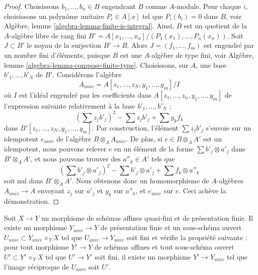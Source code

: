 \begin{proof}
Choisissons $b_1, \ldots, b_n \in B$ engendrant $B$ comme $A$-module.
Pour chaque $i$, choisissons un polynôme unitaire $P_i \in A[x]$ tel que $P_i(b_i) = 0$
dans $B$, voir Algèbre, lemme \ref{algebra-lemma-finite-is-integral}.
Ainsi, $B$ est un quotient de la $A$-algèbre libre de rang fini
$B' = A[x_1, \ldots, x_n]/(P_1(x_1), \ldots, P_n(x_n))$.
Soit $J \subset B'$ le noyau de la surjection $B' \to B$.
Alors $J =(f_1, \ldots, f_m)$ est engendré par un nombre fini d'éléments, puisque $B$
est une $A$-algèbre de type fini, voir
Algèbre, lemme \ref{algebra-lemma-compose-finite-type}.
Choisissons, sur $A$, une base $b'_1, \ldots, b'_N$ de $B'$.
Considérons l'algèbre
$$
A_{univ} = A[z_1, \ldots, z_N, y_1, \ldots, y_m]/I
$$
où $I$ est l'idéal engendré par les coefficients dans
$A[z_1, \ldots, z_n, y_1, \ldots, y_m]$
de l'expression suivante relativement à la base $b'_1, \ldots, b'_N$ :
$$
(\sum z_j b'_j)^2 - \sum z_j b'_j + \sum y_k f_k
$$
dans $B'[z_1, \ldots, z_N, y_1, \ldots, y_m]$. Par construction,
l'élément $\sum z_j b'_j$ s'envoie sur un idempotent $e_{univ}$ de
l'algèbre $B \otimes_A A_{univ}$. De plus, si $e \in B \otimes_A A'$
est un idempotent, nous pouvons relever $e$ en un élément de la forme
$\sum b'_j \otimes a'_j$ dans $B' \otimes_A A'$, et nous pouvons trouver
des $a''_k \in A'$ tels que
$$
(\sum b'_j \otimes a'_j)^2 - \sum b'_j \otimes a'_j + \sum f_k \otimes a''_k
$$
soit nul dans $B' \otimes_A A'$. Nous obtenons donc un homomorphisme de $A$-algèbres
$A_{univ} \to A$ envoyant $z_j$ sur $a'_j$ et $y_k$ sur $a''_k$,
et $e_{univ}$ sur $e$. Ceci achève la démonstration.
\end{proof}

\begin{lemma}
\label{lemma-open-and-closed-in-quasi-finite}
Soit $X \to Y$ un morphisme de schémas affines quasi-fini et
de présentation finie. Il existe un morphisme $Y_{univ} \to Y$
de présentation finie et un sous-schéma ouvert
$U_{univ} \subset Y_{univ} \times_Y X$ tel que
$U_{univ} \to Y_{univ}$ soit fini et vérifie la propriété suivante :
pour tout morphisme $Y' \to Y$ de schémas affines
et tout sous-schéma ouvert $U' \subset Y' \times_Y X$
tel que $U' \to Y'$ soit fini, il existe un morphisme
$Y' \to Y_{univ}$ tel que l'image réciproque de $U_{univ}$ soit $U'$.
\end{lemma}

